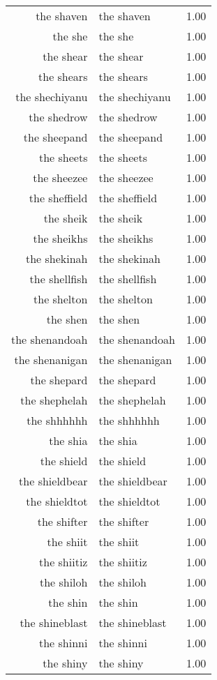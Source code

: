 \begin{table}[ht]
\begin{tabular}{rlr}
  the shaven & the shaven & 1.00 \\ 
  the she & the she & 1.00 \\ 
  the shear & the shear & 1.00 \\ 
  the shears & the shears & 1.00 \\ 
  the shechiyanu & the shechiyanu & 1.00 \\ 
  the shedrow & the shedrow & 1.00 \\ 
  the sheepand & the sheepand & 1.00 \\ 
  the sheets & the sheets & 1.00 \\ 
  the sheezee & the sheezee & 1.00 \\ 
  the sheffield & the sheffield & 1.00 \\ 
  the sheik & the sheik & 1.00 \\ 
  the sheikhs & the sheikhs & 1.00 \\ 
  the shekinah & the shekinah & 1.00 \\ 
  the shellfish & the shellfish & 1.00 \\ 
  the shelton & the shelton & 1.00 \\ 
  the shen & the shen & 1.00 \\ 
  the shenandoah & the shenandoah & 1.00 \\ 
  the shenanigan & the shenanigan & 1.00 \\ 
  the shepard & the shepard & 1.00 \\ 
  the shephelah & the shephelah & 1.00 \\ 
  the shhhhhh & the shhhhhh & 1.00 \\ 
  the shia & the shia & 1.00 \\ 
  the shield & the shield & 1.00 \\ 
  the shieldbear & the shieldbear & 1.00 \\ 
  the shieldtot & the shieldtot & 1.00 \\ 
  the shifter & the shifter & 1.00 \\ 
  the shiit & the shiit & 1.00 \\ 
  the shiitiz & the shiitiz & 1.00 \\ 
  the shiloh & the shiloh & 1.00 \\ 
  the shin & the shin & 1.00 \\ 
  the shineblast & the shineblast & 1.00 \\ 
  the shinni & the shinni & 1.00 \\ 
  the shiny & the shiny & 1.00 \\ 

\end{tabular}
\end{table}
